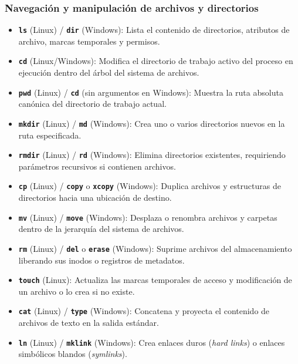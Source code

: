 \documentclass[12pt]{article}
\begin{document}
\subsubsection{Navegación y manipulación de archivos y directorios}
\begin{itemize}[leftmargin=*, noitemsep, topsep=2pt]
    \item \textbf{\texttt{ls}} (Linux) / \textbf{\texttt{dir}} (Windows): Lista el contenido de directorios, atributos de archivo, marcas temporales y permisos.
    \item \textbf{\texttt{cd}} (Linux/Windows): Modifica el directorio de trabajo activo del proceso en ejecución dentro del árbol del sistema de archivos.
    \item \textbf{\texttt{pwd}} (Linux) / \textbf{\texttt{cd}} (sin argumentos en Windows): Muestra la ruta absoluta canónica del directorio de trabajo actual.
    \item \textbf{\texttt{mkdir}} (Linux) / \textbf{\texttt{md}} (Windows): Crea uno o varios directorios nuevos en la ruta especificada.
    \item \textbf{\texttt{rmdir}} (Linux) / \textbf{\texttt{rd}} (Windows): Elimina directorios existentes, requiriendo parámetros recursivos si contienen archivos.
    \item \textbf{\texttt{cp}} (Linux) / \textbf{\texttt{copy}} o \textbf{\texttt{xcopy}} (Windows): Duplica archivos y estructuras de directorios hacia una ubicación de destino.
    \item \textbf{\texttt{mv}} (Linux) / \textbf{\texttt{move}} (Windows): Desplaza o renombra archivos y carpetas dentro de la jerarquía del sistema de archivos.
    \item \textbf{\texttt{rm}} (Linux) / \textbf{\texttt{del}} o \textbf{\texttt{erase}} (Windows): Suprime archivos del almacenamiento liberando sus inodos o registros de metadatos.
    \item \textbf{\texttt{touch}} (Linux): Actualiza las marcas temporales de acceso y modificación de un archivo o lo crea si no existe.
    \item \textbf{\texttt{cat}} (Linux) / \textbf{\texttt{type}} (Windows): Concatena y proyecta el contenido de archivos de texto en la salida estándar.
    \item \textbf{\texttt{ln}} (Linux) / \textbf{\texttt{mklink}} (Windows): Crea enlaces duros (\textit{hard links}) o enlaces simbólicos blandos (\textit{symlinks}).
\end{itemize}
\end{document}
